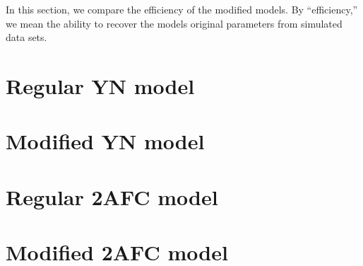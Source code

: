 \documentclass[man]{apa6}
\begin{document}
In this section, we compare the efficiency of the modified models. By ``efficiency,'' we mean the ability to recover the models original parameters from simulated data sets.


\appendix
\label{app:a}
\section{Regular YN model}

\appendix
\label{app:b}
\section{Modified YN model}

\appendix
\label{app:c}
\section{Regular 2AFC model}

\appendix
\label{app:c}
\section{Modified 2AFC model}

\end{document}
